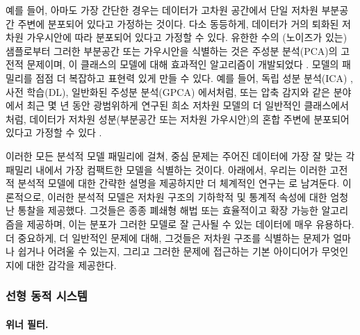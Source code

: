 \documentclass[../../book-main_ko.tex]{subfiles}
\begin{document}
예를 들어, 아마도 가장 간단한 경우는 데이터가 고차원 공간에서 단일 저차원 부분공간 주변에 분포되어 있다고 가정하는 것이다. 다소 동등하게, 데이터가 거의 퇴화된 저차원 가우시안에 따라 분포되어 있다고 가정할 수 있다. 유한한 수의 (노이즈가 있는) 샘플로부터 그러한 부분공간 또는 가우시안을 식별하는 것은 주성분 분석(PCA)의 고전적 문제이며, 이 클래스의 모델에 대해 효과적인 알고리즘이 개발되었다 \cite{JolliffeI2002}. 모델의 패밀리를 점점 더 복잡하고 표현력 있게 만들 수 있다. 예를 들어, 독립 성분 분석(ICA) \cite{Ans-1985}, 사전 학습(DL), 일반화된 주성분 분석(GPCA) \cite{Vidal-GPCA}에서처럼, 또는 압축 감지와 같은 분야에서 최근 몇 년 동안 광범위하게 연구된 희소 저차원 모델의 더 일반적인 클래스에서처럼, 데이터가 저차원 성분(부분공간 또는 저차원 가우시안)의 혼합 주변에 분포되어 있다고 가정할 수 있다 \cite{Wright-Ma-2022}.

이러한 모든 분석적 모델 패밀리에 걸쳐, 중심 문제는 주어진 데이터에 가장 잘 맞는 각 패밀리 내에서 가장 컴팩트한 모델을 식별하는 것이다. 아래에서, 우리는 이러한 고전적 분석적 모델에 대한 간략한 설명을 제공하지만 더 체계적인 연구는 로 남겨둔다. 이론적으로, 이러한 분석적 모델은 저차원 구조의 기하학적 및 통계적 속성에 대한 엄청난 통찰을 제공했다. 그것들은 종종 폐쇄형 해법 또는 효율적이고 확장 가능한 알고리즘을 제공하며, 이는 분포가 그러한 모델로 잘 근사될 수 있는 데이터에 매우 유용하다. 더 중요하게, 더 일반적인 문제에 대해, 그것들은 저차원 구조를 식별하는 문제가 얼마나 쉽거나 어려울 수 있는지, 그리고 그러한 문제에 접근하는 기본 아이디어가 무엇인지에 대한 감각을 제공한다.


\subsubsection{선형 동적 시스템}
\label{sec:linear-systems}

\paragraph{위너 필터.}
\end{document}
